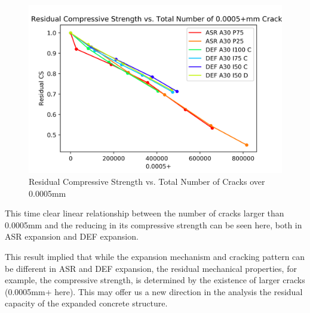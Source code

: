 \begin{figure}[ht]
\centering
\includegraphics[width=.8\linewidth]{Files/exp_3D/Residual_Compressive_Strength_vs_Total_Number_of_0005_Cracks.png}
  \caption{Residual Compressive Strength vs. Total Number of Cracks over 0.0005mm}
  \label{fig:Total_Number_of_Cracks_0.0005+}
\end{figure}



This time clear linear relationship between the number of cracks larger than 0.0005mm and the reducing in its compressive strength can be seen here, both in ASR expansion and DEF expansion.

This result implied that while the expansion mechanism and cracking pattern can be different in ASR and DEF expansion, the residual mechanical properties, for example, the compressive strength, is determined by the existence of larger cracks (0.0005mm+ here). This may offer us a new direction in the analysis the residual capacity of the expanded concrete structure.


